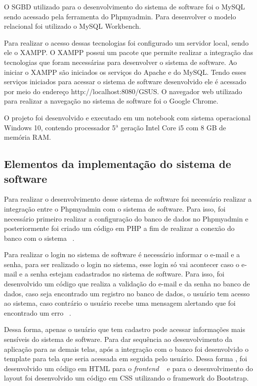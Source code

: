 O \acrfull{SGBD} utilizado para o desenvolvimento do sistema de software foi o MySQL sendo acessado pela ferramenta do Phpmyadmin. Para desenvolver o modelo relacional foi utilizado o MySQL Workbench. 

Para realizar o acesso dessas tecnologias foi configurado um servidor local, sendo ele o XAMPP. O XAMPP possui um pacote que permite realizar a integração das tecnologias que foram necessárias para desenvolver o sistema de software.
Ao iniciar o XAMPP são iniciados os serviços do Apache e do MySQL. Tendo esses serviços iniciados para acessar o sistema de software desenvolvido ele é acessado por meio do endereço http://localhost:8080/GSUS. O navegador web utilizado para realizar a navegação no sistema de software foi o Google Chrome.

O projeto foi desenvolvido e executado em um notebook com sistema operacional Windows 10, contendo processador \newcommand{\azinho}{$^{\mathrm a}$} 5$^{\mathrm a}$ geração Intel Core i5 com 8 GB de memória RAM.

\subsection{Elementos da implementação do sistema de software}

Para realizar o desenvolvimento desse sistema de software foi necessário realizar a integração entre o Phpmyadmin com o sistema de software. Para isso, foi necessário primeiro realizar a configuração do banco de dados no Phpmyadmin e posteriormente foi criado um código em PHP a fim de realizar a conexão do banco com o sistema ~.

%

Para realizar o login no sistema de software é necessário informar o e-mail e a senha, para ser realizado o login no sistema, esse login só vai acontecer caso o e-mail e a senha estejam cadastrados no sistema de software. Para isso, foi desenvolvido um código que realiza a validação do e-mail e da senha no banco de dados, caso seja encontrado um registro no banco de dados, o usuário tem acesso ao sistema, caso contrário o usuário recebe uma mensagem alertando que foi encontrado um erro ~.


%

Dessa forma, apenas o usuário que tem cadastro pode acessar informações mais sensíveis do sistema de software.
Para dar sequência ao desenvolvimento da aplicação para as demais telas, após a integração com o banco foi desenvolvido o template para tela que seria acessada em seguida pelo usuário. Dessa forma , foi desenvolvido um código em \acrfull{HTML} para o \emph{frontend} ~ e para o desenvolvimento do layout foi desenvolvido um código em \acrfull{CSS} utilizando o framework do Bootstrap.

